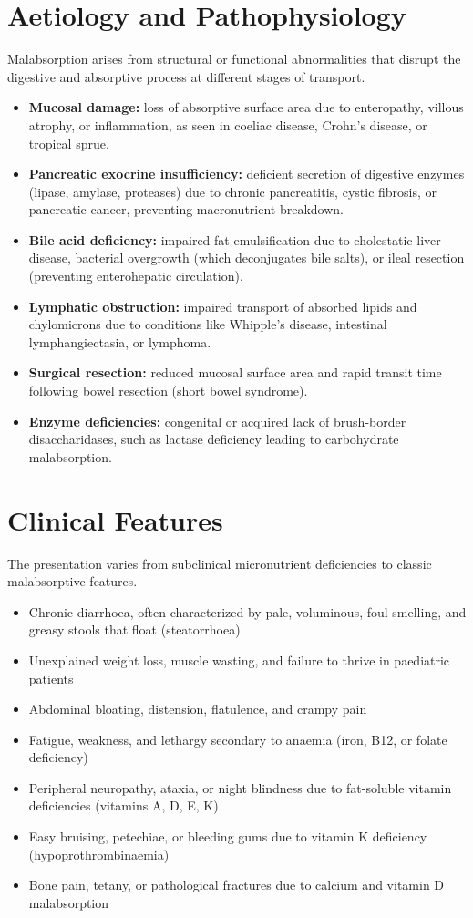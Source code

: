 \section*{Aetiology and Pathophysiology}
Malabsorption arises from structural or functional abnormalities that disrupt the digestive and absorptive process at different stages of transport.
\begin{itemize}
    \item \textbf{Mucosal damage:} loss of absorptive surface area due to enteropathy, villous atrophy, or inflammation, as seen in coeliac disease, Crohn's disease, or tropical sprue.
    \item \textbf{Pancreatic exocrine insufficiency:} deficient secretion of digestive enzymes (lipase, amylase, proteases) due to chronic pancreatitis, cystic fibrosis, or pancreatic cancer, preventing macronutrient breakdown.
    \item \textbf{Bile acid deficiency:} impaired fat emulsification due to cholestatic liver disease, bacterial overgrowth (which deconjugates bile salts), or ileal resection (preventing enterohepatic circulation).
    \item \textbf{Lymphatic obstruction:} impaired transport of absorbed lipids and chylomicrons due to conditions like Whipple's disease, intestinal lymphangiectasia, or lymphoma.
    \item \textbf{Surgical resection:} reduced mucosal surface area and rapid transit time following bowel resection (short bowel syndrome).
    \item \textbf{Enzyme deficiencies:} congenital or acquired lack of brush-border disaccharidases, such as lactase deficiency leading to carbohydrate malabsorption.
\end{itemize}

\section*{Clinical Features}
The presentation varies from subclinical micronutrient deficiencies to classic malabsorptive features.
\begin{itemize}
    \item Chronic diarrhoea, often characterized by pale, voluminous, foul-smelling, and greasy stools that float (steatorrhoea)
    \item Unexplained weight loss, muscle wasting, and failure to thrive in paediatric patients
    \item Abdominal bloating, distension, flatulence, and crampy pain
    \item Fatigue, weakness, and lethargy secondary to anaemia (iron, B12, or folate deficiency)
    \item Peripheral neuropathy, ataxia, or night blindness due to fat-soluble vitamin deficiencies (vitamins A, D, E, K)
    \item Easy bruising, petechiae, or bleeding gums due to vitamin K deficiency (hypoprothrombinaemia)
    \item Bone pain, tetany, or pathological fractures due to calcium and vitamin D malabsorption
\end{itemize}

